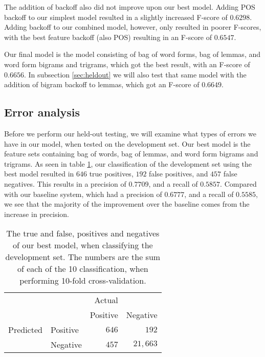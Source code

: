 \documentclass[11pt,letterpaper]{article}
\begin{document}
The addition of backoff also did not improve upon our best model. Adding POS backoff to our simplest model resulted in a slightly increased F-score of $0.6298$. Adding backoff to our combined model, however, only resulted in poorer F-scores, with the best feature backoff (also POS) resulting in an F-score of $0.6547$.

Our final model is the model consisting of bag of word forms, bag of lemmas, and word form bigrams and trigrams, which got the best result, with an F-score of $0.6656$. In subsection \ref{sec:heldout} we will also test that same model with the addition of bigram backoff to lemmas, which got an F-score of $0.6649$.






\subsection{Error analysis}

Before we perform our held-out testing, we will examine what types of errors we have in our model, when tested on the development set. Our best model is the feature sets containing bag of words, bag of lemmas, and word form bigrams and trigrams. As seen in table \ref{tab:positives}, our classification of the development set using the best model resulted in $646$ true positives, $192$ false positives, and $457$ false negatives. This results in a precision of $0.7709$, and a recall of $0.5857$. Compared with our baseline system, which had a precision of $0.6777$, and a recall of $0.5585$, we see that the majority of the improvement over the baseline comes from the increase in precision.

\begin{table}
  \begin{center}
    \begin{tabular}{llrr}
      \toprule
      
      & & Actual & \\
      &  & Positive & Negative\\
      \midrule
      Predicted & Positive & $646$ & $192$ \\
      & Negative & $457$ & $21,663$ \\
      
      
      \bottomrule

    \end{tabular}
  \end{center}
  \caption{The true and false, positives and negatives of our best model, when classifying the development set. The numbers are the sum of each of the 10 classification, when performing 10-fold cross-validation.}
  \label{tab:positives}
\end{table}
\end{document}

